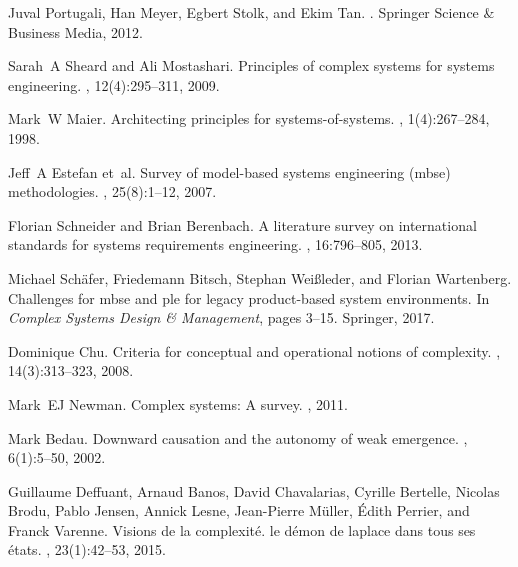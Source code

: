 \documentclass[runningheads,a4paper]{llncs}
\begin{document}
\begin{thebibliography}{10}

Juval Portugali, Han Meyer, Egbert Stolk, and Ekim Tan.
.
\newblock Springer Science \& Business Media, 2012.

Sarah~A Sheard and Ali Mostashari.
\newblock Principles of complex systems for systems engineering.
, 12(4):295--311, 2009.

Mark~W Maier.
\newblock Architecting principles for systems-of-systems.
, 1(4):267--284, 1998.

Jeff~A Estefan et~al.
\newblock Survey of model-based systems engineering (mbse) methodologies.
, 25(8):1--12, 2007.

Florian Schneider and Brian Berenbach.
\newblock A literature survey on international standards for systems
  requirements engineering.
, 16:796--805, 2013.

Michael Sch{\"a}fer, Friedemann Bitsch, Stephan Wei{\ss}leder, and Florian
  Wartenberg.
\newblock Challenges for mbse and ple for legacy product-based system
  environments.
\newblock In {\em Complex Systems Design \& Management}, pages 3--15. Springer,
  2017.

Dominique Chu.
\newblock Criteria for conceptual and operational notions of complexity.
, 14(3):313--323, 2008.

Mark~EJ Newman.
\newblock Complex systems: A survey.
, 2011.

Mark Bedau.
\newblock Downward causation and the autonomy of weak emergence.
,
  6(1):5--50, 2002.

Guillaume Deffuant, Arnaud Banos, David Chavalarias, Cyrille Bertelle, Nicolas
  Brodu, Pablo Jensen, Annick Lesne, Jean-Pierre M{\"u}ller, {\'E}dith Perrier,
  and Franck Varenne.
\newblock Visions de la complexit{\'e}. le d{\'e}mon de laplace dans tous ses
  {\'e}tats.
, 23(1):42--53, 2015.


\end{thebibliography}
\end{document}

